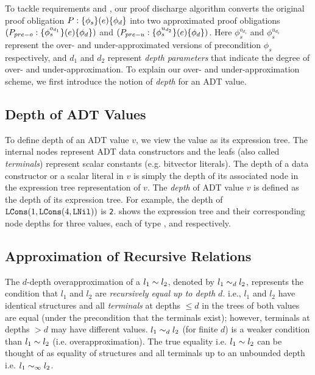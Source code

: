 To tackle requirements  and ,
our proof discharge algorithm converts the original proof obligation $P: \{\phi_s\}(e)\{\phi_d\}$
into two approximated proof obligations $(P_{pre-o}: \{\phi^{o_{d_1}}_s\}(e)\{\phi_d\})$
and $(P_{pre-u}: \{\phi^{u_{d_2}}_s\}(e)\{\phi_d\})$.
Here $\phi^{o_{d_1}}_s$ and $\phi^{u_{d_2}}_s$ represent the over- and under-approximated
versions of precondition $\phi_s$ respectively, and $d_1$ and $d_2$ represent
{\em depth parameters} that indicate the degree of over- and under-approximation.
To explain our over- and under-approximation scheme, we
first introduce the notion of {\em depth} for an ADT value.

\subsection{Depth of ADT Values}
\label{sec:adtdepth}
To define depth of an ADT value $v$, we view the value as its expression tree.
The internal nodes represent ADT data constructors and
the leafs (also called {\em terminals}) represent scalar constants (e.g. bitvector literals).
The depth of a data constructor or a scalar literal in $v$ is simply the depth of
its associated node in the expression tree representation of $v$.
The {\em depth} of ADT value $v$ is defined as the depth of its expression tree.
For example, the depth of ${\tt LCons}(1, {\tt LCons}(4, {\tt LNil}))$ is {\tt 2}.
 shows the expression tree and their corresponding node depths for three values,
each of type ,  and  respectively.

\subsection{Approximation of Recursive Relations}
\label{sec:approxdefs}
The $d$-depth overapproximation of a \recursiveRelation{} $l_1 \sim{} l_2$,
denoted by $l_1 \sim_{d} l_2$, represents the condition that
$l_1$ and $l_2$ are {\em recursively equal up to depth $d$}. i.e.,
$l_1$ and $l_2$ have identical structures and all
{\em terminals} at depths $\leq d$ in the trees of both values
are equal (under the precondition that the terminals exist);
however, terminals at depths $>d$ may have different values.
$l_1 \sim_{d} l_2$ (for finite $d$) is a weaker
condition than $l_1 \sim{} l_2$ (i.e. overapproximation).
The true equality i.e. $l_1 \sim{} l_2$ can be thought of as equality of structures
and all terminals up to an unbounded depth i.e. $l_1 \sim_{\infty} l_2$.

